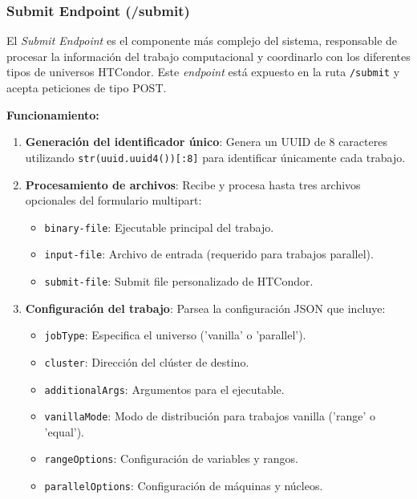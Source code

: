 \subsubsection{Submit Endpoint (/submit)}
\noindent

El \textit{Submit Endpoint} es el componente más complejo del sistema, responsable de procesar la información del trabajo computacional y coordinarlo con los diferentes tipos de universos HTCondor. Este \textit{endpoint} está expuesto en la ruta \texttt{/submit} y acepta peticiones de tipo POST.

\textbf{Funcionamiento:}

\begin{enumerate}
	\item \textbf{Generación del identificador único}: Genera un UUID de 8 caracteres utilizando \texttt{str(uuid.uuid4())[:8]} para identificar únicamente cada trabajo.

	\item \textbf{Procesamiento de archivos}: Recibe y procesa hasta tres archivos opcionales del formulario multipart:
	      \begin{itemize}
		      \item \texttt{binary-file}: Ejecutable principal del trabajo.
		      \item \texttt{input-file}: Archivo de entrada (requerido para trabajos parallel).
		      \item \texttt{submit-file}: Submit file personalizado de HTCondor.
	      \end{itemize}

	\item \textbf{Configuración del trabajo}: Parsea la configuración JSON que incluye:
	      \begin{itemize}
		      \item \texttt{jobType}: Especifica el universo ('vanilla' o 'parallel').
		      \item \texttt{cluster}: Dirección del clúster de destino.
		      \item \texttt{additionalArgs}: Argumentos para el ejecutable.
		      \item \texttt{vanillaMode}: Modo de distribución para trabajos vanilla ('range' o 'equal').
		      \item \texttt{rangeOptions}: Configuración de variables y rangos.
		      \item \texttt{parallelOptions}: Configuración de máquinas y núcleos.
	      \end{itemize}


\end{enumerate}
